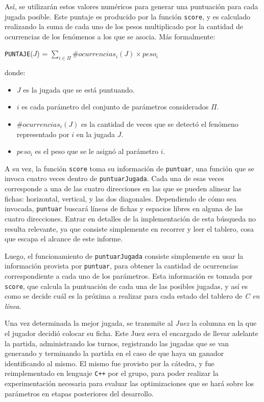 \documentclass[12pt,a4paper]{article}
\begin{document}
    Así, se utilizarán estos valores numéricos para generar una puntuación para cada jugada posible. Este puntaje es producido por la función \texttt{score}, y es calculado realizando la suma de cada uno de los pesos multiplicado por la cantidad de ocurrencias de los fenómenos a los que se asocia. Más formalmente:
    
    \begin{center}
        \texttt{PUNTAJE}($J$) =  $\sum_{i \in \Pi} \#ocurrencias_{i}(J) \times peso_{i} $ 
    \end{center}
    
    donde:
    \begin{itemize}
        \item $J$ es la jugada que se está puntuando.
        \item $i$ es cada parámetro del conjunto de parámetros considerados $\Pi$.
        \item $\#ocurrencias_{i}(J)$ es la cantidad de veces que se detectó el fenómeno representado por $i$ en la jugada $J$.
        \item $peso_{i}$ es el peso que se le asignó al parámetro $i$.
    \end{itemize}

    A su vez, la función \texttt{score} toma su información de \texttt{puntuar}, una función que se invoca cuatro veces dentro de \texttt{puntuarJugada}. Cada una de esas veces corresponde a una de las cuatro direcciones en las que se pueden alinear las fichas: horizontal, vertical, y las dos diagonales. Dependiendo de cómo sea invocada, \texttt{puntuar} buscará líneas de fichas y espacios libres en alguna de las cuatro direcciones. Entrar en detalles de la implementación de esta búsqueda no resulta relevante, ya que consiste simplemente en recorrer y leer el tablero, cosa que escapa el alcance de este informe.
        
    Luego, el funcionamiento de \texttt{puntuarJugada} consiste simplemente en usar la información provista por \texttt{puntuar}, para obtener la cantidad de ocurrencias correspondiente a cada uno de los parámetros. Esta información es tomada por \texttt{score}, que calcula la puntuación de cada una de las posibles jugadas, y así es como se decide cuál es la próxima a realizar para cada estado del tablero de \textit{C en línea}.
    
    Una vez determinada la mejor jugada, se transmite al \textit{Juez} la columna en la que el jugador decidió colocar su ficha. Este Juez sera el encargado de llevar adelante la partida, administrando los turnos, registrando las jugadas que se van generando y terminando la partida en el caso de que haya un ganador identificando al mismo. El mismo fue provisto por la cátedra, y fue reimplementado en lenguaje \texttt{C++} por el grupo, para poder realizar la experimentación necesaria para evaluar las optimizaciones que se hará sobre los parámetros en etapas posteriores del desarrollo.
    
\end{document}
